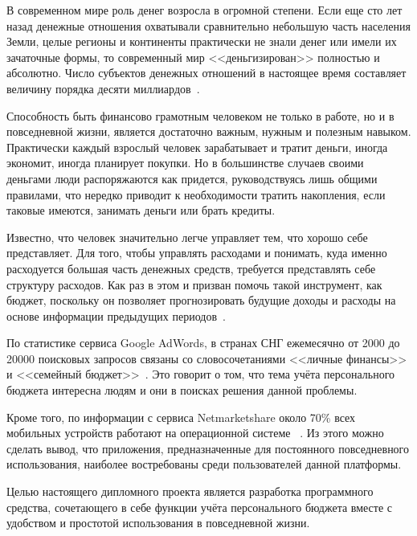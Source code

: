 \label{sec:introduction}

В современном мире роль денег возросла в огромной степени.
Если еще сто лет назад денежные отношения охватывали сравнительно небольшую часть населения Земли, целые регионы и континенты практически не знали денег или имели их зачаточные формы, то современный мир <<деньгизирован>> полностью и абсолютно.
Число субъектов денежных отношений в настоящее время составляет величину порядка десяти миллиардов~\cite{money_egorov}.

Способность быть финансово грамотным человеком не только в работе, но и в повседневной жизни, является достаточно важным, нужным и полезным навыком.
Практически каждый взрослый человек зарабатывает и тратит деньги, иногда экономит, иногда планирует покупки.
Но в большинстве случаев своими деньгами люди распоряжаются как придется, руководствуясь лишь общими правилами, что нередко приводит к необходимости тратить накопления, если таковые имеются, занимать деньги или брать кредиты.

Известно, что человек значительно легче управляет тем, что хорошо себе представляет.
Для того, чтобы управлять расходами и понимать, куда именно расходуется большая часть денежных средств, требуется представлять себе структуру расходов.
Как раз в этом и призван помочь такой инструмент, как бюджет, поскольку он позволяет прогнозировать будущие доходы и расходы на основе информации предыдущих периодов~\cite{money_under_control}.

По статистике сервиса Google AdWords, в странах СНГ ежемесячно от 2000 до 20000 поисковых запросов связаны со словосочетаниями <<личные финансы>> и <<семейный бюджет>>~\cite{google_adwords}.
Это говорит о том, что тема учёта персонального бюджета интересна людям и они в поисках решения данной проблемы.

Кроме того, по информации с сервиса Netmarketshare около 70\% всех мобильных устройств работают на операционной системе \andro~\cite{netmarketshare}.
Из этого можно сделать вывод, что приложения, предназначенные для постоянного повседневного использования, наиболее востребованы среди пользователей данной платформы.

Целью настоящего дипломного проекта является разработка программного средства, сочетающего в себе функции учёта персонального бюджета вместе с удобством и простотой использования в повседневной жизни.

